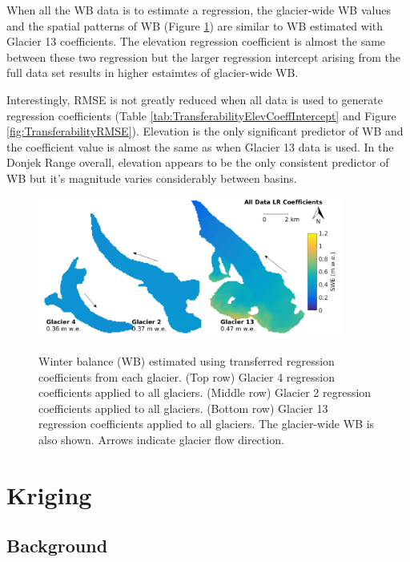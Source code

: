 \documentclass{sfuthesis}
\begin{document}
When all the WB data is to estimate a regression, the glacier-wide WB values and the spatial patterns of WB (Figure \ref{fig:MapTransferabilityComboMean}) are similar to WB estimated with Glacier 13 coefficients. The elevation regression coefficient is almost the same between these two regression but the larger regression intercept arising from the full data set results in higher estaimtes of glacier-wide WB. 

Interestingly, RMSE is not greatly reduced when all data is used to generate regression coefficients (Table \ref{tab:TransferabilityElevCoeffIntercept} and Figure \ref{fig:TransferabilityRMSE}). Elevation is the only significant predictor of WB and the coefficient value is almost the same as when Glacier 13 data is used. In the Donjek Range overall, elevation appears to be the only consistent predictor of WB but it's magnitude varies considerably between basins. 

\begin{figure}[H]
	\centering
	\includegraphics[width =0.9\textwidth]{MapTransferabilityComboCoeffs.png}\\
	\caption{Winter balance (WB) estimated using transferred regression coefficients from each glacier. (Top row) Glacier 4 regression coefficients applied to all glaciers. (Middle row) Glacier 2 regression coefficients applied to all glaciers. (Bottom row) Glacier 13 regression coefficients applied to all glaciers. The glacier-wide WB is also shown. Arrows indicate glacier flow direction.}
	\label{fig:MapTransferabilityComboMean}
\end{figure}

\section{Kriging}
\label{sec:kriging}

\subsection{Background}
\end{document}
